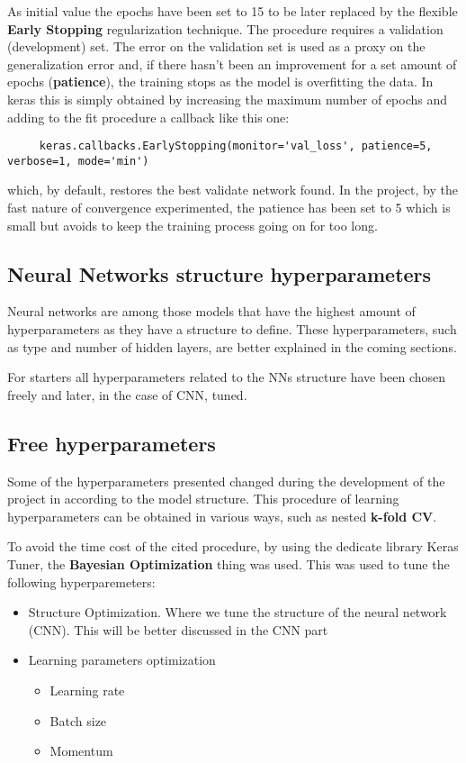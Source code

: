 As initial value the epochs have been set to 15 to be later replaced by the flexible \textbf{Early Stopping} regularization technique.
The procedure requires a validation (development) set.
The error on the validation set is used as a proxy on the generalization error and, if there hasn't been an improvement
for a set amount of epochs (\textbf{patience}), the training stops as the model is overfitting the data.
In keras this is simply obtained by increasing the maximum number of epochs and adding to the fit procedure a callback like this one:
\begin{verbatim}
     keras.callbacks.EarlyStopping(monitor='val_loss', patience=5, verbose=1, mode='min')
\end{verbatim}

which, by default, restores the best validate network found.
In the project, by the fast nature of convergence experimented, the patience has been set to 5 which is small
but avoids to keep the training process going on for too long.

\subsection{Neural Networks structure hyperparameters}
\label{subsec:neural-networks-structure-hyperparameters}
Neural networks are among those models that have the highest amount of hyperparameters as they have a structure to define.
These hyperparameters, such as type and number of hidden layers, are better explained in the coming sections.


For starters all hyperparameters related to the NNs structure have been chosen freely and later, in the case of CNN, tuned.

\subsection{Free hyperparameters}
\label{subsec:free-hyperparameters}
Some of the hyperparameters presented changed during the development of the project in according to the model structure.
This procedure of learning hyperparameters can be obtained in various ways, such as nested \textbf{k-fold CV}.


To avoid the time cost of the cited procedure, by using the dedicate library Keras Tuner,  the
\textbf{Bayesian Optimization} thing was used. This was used to tune the following hyperparemeters:

\begin{itemize}
    \item Structure Optimization. Where we tune the structure of the neural network (CNN).
    This will be better discussed in the CNN part %
    \item Learning parameters optimization
    \begin{itemize}
        \item Learning rate
        \item Batch size
        \item Momentum
    \end{itemize}
\end{itemize}
